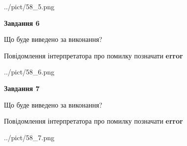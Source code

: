 \documentclass[10pt, ukrainian]{article}
\begin{document}
{\begin {large}
\begin{center}
	{../pict/58_5.png}
\end{center}
\newpage

{\begin {center}\textbf{Завдання 6}\end {center}}\par
Що буде виведено за виконання? \par
Повідомлення інтерпретатора про помилку позначати \textbf{error}

\begin{center}
	{../pict/58_6.png}
\end{center}
\newpage

{\begin {center}\textbf{Завдання 7}\end {center}}\par
Що буде виведено за виконання? \par
Повідомлення інтерпретатора про помилку позначати \textbf{error}

\begin{center}
	{../pict/58_7.png}
\end{center}
\newpage

\end {large}}
\end{document}
